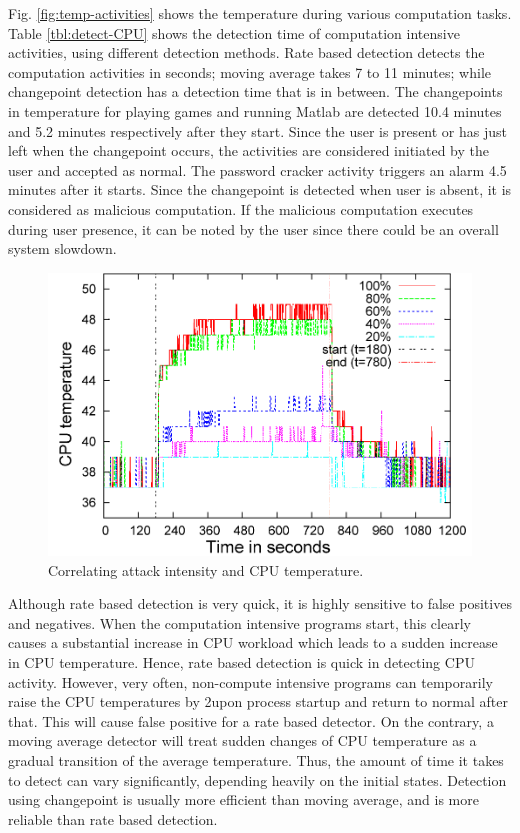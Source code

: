 Fig. \ref{fig:temp-activities} shows the temperature during various
computation tasks. Table \ref{tbl:detect-CPU} shows the detection time of computation intensive activities, using different detection methods. Rate based detection detects the computation activities in seconds; moving average takes 7 to 11 minutes; while changepoint detection has a detection time that is in between. 
The changepoints in temperature for playing games
and running Matlab are detected 10.4 minutes and 5.2
minutes respectively after they start. Since the user is present or
has just left when the changepoint occurs, the activities are considered
initiated by the user and accepted as normal. The password cracker
activity triggers an alarm 4.5 minutes after it starts. Since the
changepoint is detected when user is absent, it is considered as
malicious computation. If the malicious computation executes during
user presence, it can be noted by the user since there could be an
overall system slowdown.

\begin{figure}[tb]
\centering
\includegraphics[width=1.4\columnwidth]{sensor/passwd-line.png}
\caption{Correlating attack intensity and CPU temperature. }
\label{fig:pwd-vary}
\end{figure}

Although rate based detection is very quick, it is highly sensitive to
false positives and negatives. When the computation intensive programs start, 
this clearly causes a substantial increase in CPU workload
which leads to a sudden increase in CPU temperature. 
Hence, rate based detection is quick in detecting CPU activity.
However, very often, non-compute intensive programs can temporarily raise the CPU temperatures by 2\degree upon process startup and return to normal 
after that. This will cause false positive for a rate based detector. 
On the contrary, a moving average detector will treat
sudden changes of CPU temperature as a gradual transition 
of the average temperature. Thus, the amount of time
it takes to detect can vary significantly,
depending heavily on the initial states. 
Detection using changepoint is usually more efficient than moving average, 
and is more reliable than rate based detection.

